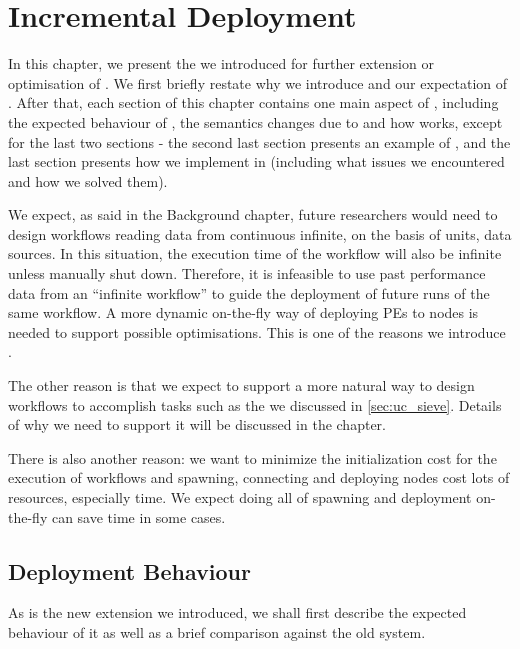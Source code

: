 \newcommand{\defNode}[1]{%
  \expandafter\def\csname nd#1\endcsname{\emph{#1}\xspace}}
\newcommand{\defNodes}[1]{\forcsvlist{\defNode}{#1}}

\chapter{Incremental Deployment}
In this chapter, we present the \tincdep we introduced for further extension or optimisation of \dpy. We first briefly restate why we introduce \tincdep and our expectation of \tincdep. After that, each section of this chapter contains one main aspect of \tincdep, including the expected behaviour of \tincdep, the semantics changes due to \tincdep and how \tincdep works, except for the last two sections - the second last section presents an example of \tincdep, and the last section presents how we implement \tincdep in \dpy (including what issues we encountered and how we solved them).

We expect, as said in the Background chapter, future researchers would need to design workflows reading data from continuous infinite, on the basis of units, data sources. In this situation, the execution time of the workflow will also be infinite unless manually shut down. Therefore, it is infeasible to use past performance data from an ``infinite workflow'' to guide the deployment of future runs of the same workflow. A more dynamic on-the-fly way of deploying PEs to nodes is needed to support possible optimisations. This is one of the reasons we introduce \tincdep.

The other reason is that we expect to support a more natural way to design workflows to accomplish tasks such as the \tsieve we discussed in \ref{sec:uc_sieve}. Details of why we need \tincdep to support it will be discussed in the  chapter.

There is also another reason: we want to minimize the initialization cost for the execution of workflows and spawning, connecting and deploying nodes cost lots of resources, especially time. We expect doing all of spawning and deployment on-the-fly can save time in some cases.

\section{Deployment Behaviour}
As \tincdep is the new extension we introduced, we shall first describe the expected behaviour of it as well as a brief comparison against the old system.

